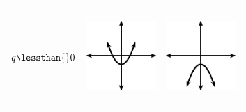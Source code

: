 \begin{center}
\begin{xtabular*}{\mytablewidth}[t]{|p{10\mystarwidth}|p{10\mystarwidth}|p{10\mystarwidth}|}
\begin{center}
\vspace{2pt}
\vspace{.1in}
\end{center}    
\tabularnewline{}
    $q\lessthan{}0$
    &
\setcounter{subfigure}{0}
\label{m39345*id242017}
\begin{center}
\label{m39345*id242017!!!underscore!!!media}\label{m39345*id242017!!!underscore!!!printimage}\includegraphics[width=100px]{col11306.imgs/m39345_MG10C11_017.png} %
\vspace{2pt}
\vspace{.1in}
\end{center}    
    &
\setcounter{subfigure}{0}
\label{m39345*id242029}
\begin{center}
\label{m39345*id242029!!!underscore!!!media}\label{m39345*id242029!!!underscore!!!printimage}\includegraphics[width=100px]{col11306.imgs/m39345_MG10C11_018.png} %
\vspace{2pt}
\vspace{.1in}
\end{center}    
\tabularnewline{}
\end{xtabular*}
\end{center}
